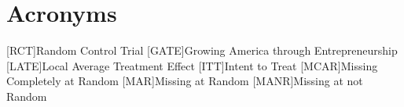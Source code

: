 
\section*{Acronyms}
\begin{acronym}
	[RCT]{Random Control Trial}
	[GATE]{Growing America through Entrepreneurship}
      	[LATE]{Local Average Treatment Effect}
	[ITT]{Intent to Treat}
	[MCAR]{Missing Completely at Random}
	[MAR]{Missing at Random}
	[MANR]{Missing at not Random}
\end{acronym}
